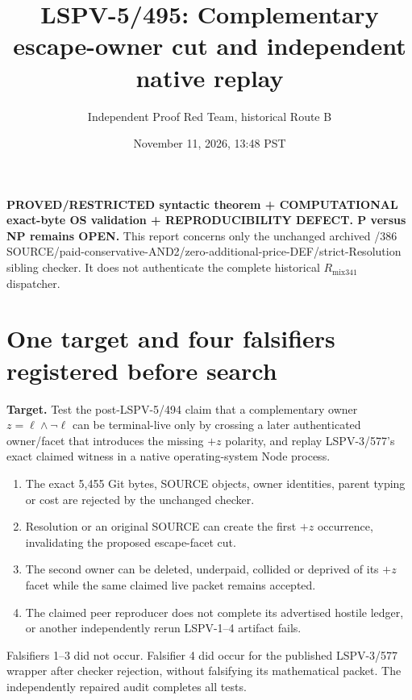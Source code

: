 \documentclass[11pt]{article}
\title{LSPV-5/495: Complementary escape-owner cut and independent native replay}
\author{Independent Proof Red Team, historical Route B}
\date{November 11, 2026, 13:48 PST}
\begin{document}
\maketitle

\noindent\textbf{PROVED/RESTRICTED syntactic theorem + COMPUTATIONAL exact-byte
OS validation + REPRODUCIBILITY DEFECT. P versus NP remains OPEN.}
This report concerns only the unchanged archived /386
SOURCE/paid-conservative-AND2/zero-additional-price-DEF/strict-Resolution
sibling checker. It does not authenticate the complete historical
$R_{\mathrm{mix341}}$ dispatcher.

\section*{One target and four falsifiers registered before search}
\textbf{Target.} Test the post-LSPV-5/494 claim that a complementary owner
$z=\ell\wedge\neg\ell$ can be terminal-live only by crossing a later
authenticated owner/facet that introduces the missing $+z$ polarity, and replay
LSPV-3/577's exact claimed witness in a native operating-system Node process.

\begin{enumerate}
\item The exact 5,455 Git bytes, SOURCE objects, owner identities, parent typing
or cost are rejected by the unchanged checker.
\item Resolution or an original SOURCE can create the first $+z$ occurrence,
invalidating the proposed escape-facet cut.
\item The second owner can be deleted, underpaid, collided or deprived of its
$+z$ facet while the same claimed live packet remains accepted.
\item The claimed peer reproducer does not complete its advertised hostile
ledger, or another independently rerun LSPV-1--4 artifact fails.
\end{enumerate}

Falsifiers 1--3 did not occur. Falsifier 4 did occur for the published
LSPV-3/577 wrapper after checker rejection, without falsifying its mathematical
packet. The independently repaired audit completes all tests.
\end{document}
